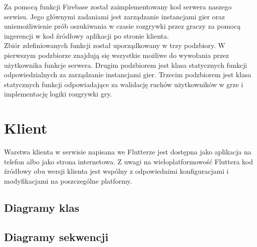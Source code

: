 Za pomocą funkcji Firebase został zaimplementowany kod serwera naszego serwisu. Jego głównymi zadaniami jest zarządzanie instancjami gier oraz uniemożliwienie prób oszukiwania w czasie rozgrywki przez graczy za pomocą ingerencji w kod źródłowy aplikacji po stronie klienta. \\

Zbiór zdefiniowanych funkcji został uporządkowany w trzy podzbiory. W pierwszym podzbiorze znajdują się wszystkie możliwe do wywołania przez użytkownika funkcje serwera. Drugim podzbiorem jest klasa statycznych funkcji odpowiedzialnych za zarządzanie instancjami gier. Trzecim podzbiorem jest klasa statycznych funkcji odpowiadające za walidację ruchów użytkowników w grze i implementację logiki rozgrywki gry. \\



\section{Klient}

Warstwa klienta w serwisie napisana we Flutterze jest dostępna jako aplikacja na telefon albo jako strona internetowa. Z uwagi na wieloplatformowość Fluttera kod źródłowy obu wersji klienta jest wspólny z odpowiednimi konfiguracjami i modyfikacjami na poszczególne platformy.

\subsection{Diagramy klas}

\subsection{Diagramy sekwencji}


